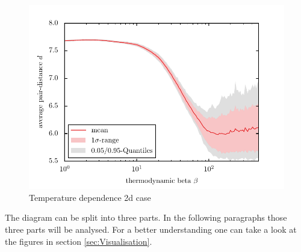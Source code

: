 \documentclass[11pt, a4paper]{article}
\numberwithin{equation}{section}
\begin{document}
\begin{figure}[!h]
	\centering
	\includegraphics{./figures/temp_dep_coulomb2d.pdf}
	\caption{Temperature dependence 2d case}
	\label{Fig:Temp_dep_Cou2D}
\end{figure}

The diagram can be split into three parts.
In the following paragraphs those three parts will be analysed.
For a better understanding one can take a look at the figures in section \ref{sec:Visualisation}.
\end{document}
